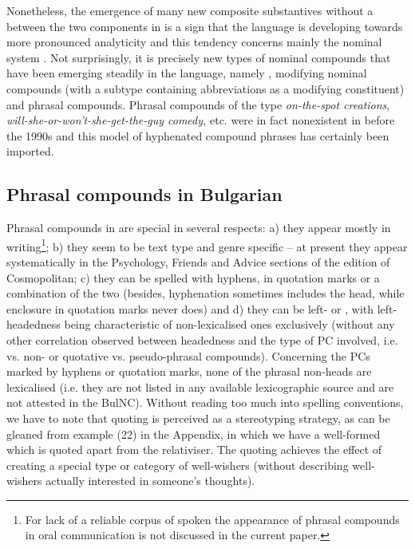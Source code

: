 \documentclass[output=paper]{LSP/langsci}
\begin{document}
Nonetheless, the emergence of many new composite substantives without a  between the two components in  is a sign that the language is developing towards more pronounced analyticity  \citep[73]{Avramova2003} and this tendency concerns mainly the nominal system \citep[100]{Vačkova1998}. Not surprisingly, it is precisely new types of nominal compounds that have been emerging steadily in the language, namely , modifying nominal compounds (with a subtype containing abbreviations as a modifying constituent) and phrasal compounds. Phrasal compounds of the type \textit{on-the-spot creations}, \textit{will-she-or-won’t-she-get-the-guy comedy,} etc. were in fact nonexistent in  before the 1990s and this model of hyphenated compound phrases has certainly been imported.



\subsection{Phrasal compounds in Bulgarian}\label{sec:bagasheva:4.2}
Phrasal compounds in  are special in several respects: a) they appear mostly in writing\footnote{For lack of a reliable corpus of spoken  the appearance of phrasal compounds in oral communication is not discussed in the current paper.}; b) they seem to be text type and genre specific – at present they appear systematically in the Psychology, Friends and Advice sections of the  edition of Cosmopolitan; c) they can be spelled with hyphens, in quotation marks or a combination of the two (besides, hyphenation sometimes includes the head, while enclosure in quotation marks never does) and d) they can be left- or , with left-headedness being characteristic of non-lexicalised ones exclusively (without any other correlation observed between headedness and the type of PC involved, i.e.  vs. non- or quotative vs. pseudo-phrasal compounds). Concerning the PCs marked by hyphens or quotation marks, none of the phrasal non-heads are lexicalised (i.e. they are not listed in any available lexicographic source and are not attested in the BulNC). Without reading too much into spelling conventions, we have to note that quoting is perceived as a stereotyping strategy, as can be gleaned from example (22) in the Appendix, in which we have a well-formed  which is quoted apart from the relativiser. The quoting achieves the effect of creating a special type or category of well-wishers (without describing well-wishers actually interested in someone’s thoughts).  
\end{document}

